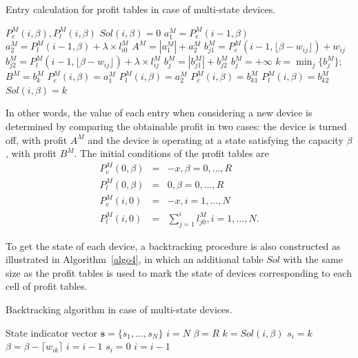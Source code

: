 \begin{algorithm}
\caption{Entry calculation for profit tables in case of multi-state devices.}
\label{algo3}
\begin{algorithmic}[1]
\Ensure $P^M_e(i,\beta),P^M_l(i,\beta)$
\State $Sol(i,\beta) = 0$
\State $a^M_1 = P^M_e(i-1,\beta)$
\State $a^M_2 = P^M_l(i-1,\beta) + \lambda \times l^M_{i0}$
\State $A^M =  \left|a^M_1\right|+a^M_2$
\State $b^M_{j1} = P^M_e(i-1,\lfloor \beta-w_{ij}\rfloor)+w_{ij}$
\State $b^M_{j2} = P^M_l(i-1,\lfloor \beta-w_{ij}\rfloor)+\lambda \times l^M_{ij}$
\State $b^M_j = \left|b^M_{j1}\right|+b^M_{j2}$
\Else
\State $b^M_j = +\infty$
\EndIf
\EndFor
\State $k = \min_j{\{b^M_j\}}$; $B^M = b^M_k$
  \State $P^M_e(i,\beta) = a^M_1$
  \State $P^M_l(i,\beta) = a^M_2 $
  \Else
  \State $P^M_e(i,\beta) = b^M_{k1}$
  \State $P^M_l(i,\beta) = b^M_{k2}$
  \State $Sol(i,\beta) = k$
\EndIf
\end{algorithmic}
\end{algorithm}
In other words, the value of each entry when considering a new device is determined by comparing the obtainable profit in two cases: the device is turned off, with profit $A^M$ and the device is operating at a state satisfying the capacity $\beta$, with profit $B^M$.
The initial conditions of the profit tables are
\begin{eqnarray*}
P^M_e(0,\beta) &=& -x,\beta=0,\ldots,R \\
P^M_l(0,\beta)&=&0,\beta = 0,\ldots,R\\
P^M_e(i,0) &=& -x,i=1,\ldots,N\\
P^M_l(i,0)&=&\sum_{j=1}^i{l^M_{j0}},i=1,\ldots,N.
\end{eqnarray*}

To get the state of each device, a backtracking procedure is also constructed as illustrated in Algorithm~\ref{algo4}, in which an additional table $Sol$ with the same size as the profit tables is used to mark the state of devices corresponding to each cell of profit tables.

\begin{algorithm}
\caption{Backtracking algorithm in case of multi-state devices.}
\label{algo4}
\begin{algorithmic}[1]
\Ensure State indicator vector $\mathbf{s} = \{s_1,\ldots,s_N\}$
\State $i = N$ 
\State $\beta =  R$
\State $k = Sol(i,\beta)$
\State $s_i = k$
\State $\beta = \beta-\lceil w_{ik} \rceil $
\State $i = i-1$
\Else
\State $s_i=0$\; $i = i-1$
\EndIf
\EndWhile
\end{algorithmic}
\end{algorithm}

